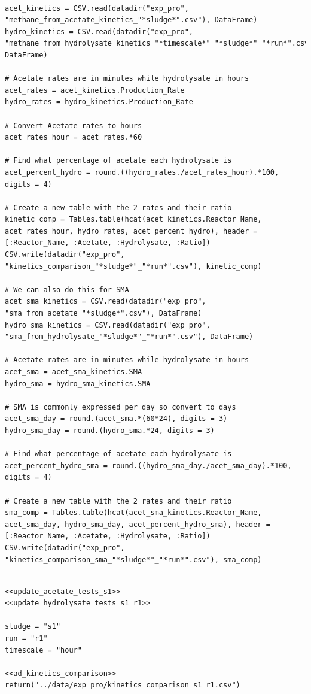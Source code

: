 \documentclass[11pt]{article}
\begin{document}
\begin{verbatim}

acet_kinetics = CSV.read(datadir("exp_pro", "methane_from_acetate_kinetics_"*sludge*".csv"), DataFrame)
hydro_kinetics = CSV.read(datadir("exp_pro", "methane_from_hydrolysate_kinetics_"*timescale*"_"*sludge*"_"*run*".csv"), DataFrame)

# Acetate rates are in minutes while hydrolysate in hours
acet_rates = acet_kinetics.Production_Rate
hydro_rates = hydro_kinetics.Production_Rate

# Convert Acetate rates to hours
acet_rates_hour = acet_rates.*60

# Find what percentage of acetate each hydrolysate is
acet_percent_hydro = round.((hydro_rates./acet_rates_hour).*100, digits = 4)

# Create a new table with the 2 rates and their ratio
kinetic_comp = Tables.table(hcat(acet_kinetics.Reactor_Name, acet_rates_hour, hydro_rates, acet_percent_hydro), header = [:Reactor_Name, :Acetate, :Hydrolysate, :Ratio])
CSV.write(datadir("exp_pro", "kinetics_comparison_"*sludge*"_"*run*".csv"), kinetic_comp)

# We can also do this for SMA
acet_sma_kinetics = CSV.read(datadir("exp_pro", "sma_from_acetate_"*sludge*".csv"), DataFrame)
hydro_sma_kinetics = CSV.read(datadir("exp_pro", "sma_from_hydrolysate_"*sludge*"_"*run*".csv"), DataFrame)

# Acetate rates are in minutes while hydrolysate in hours
acet_sma = acet_sma_kinetics.SMA
hydro_sma = hydro_sma_kinetics.SMA

# SMA is commonly expressed per day so convert to days
acet_sma_day = round.(acet_sma.*(60*24), digits = 3)
hydro_sma_day = round.(hydro_sma.*24, digits = 3)

# Find what percentage of acetate each hydrolysate is
acet_percent_hydro_sma = round.((hydro_sma_day./acet_sma_day).*100, digits = 4)

# Create a new table with the 2 rates and their ratio
sma_comp = Tables.table(hcat(acet_sma_kinetics.Reactor_Name, acet_sma_day, hydro_sma_day, acet_percent_hydro_sma), header = [:Reactor_Name, :Acetate, :Hydrolysate, :Ratio])
CSV.write(datadir("exp_pro", "kinetics_comparison_sma_"*sludge*"_"*run*".csv"), sma_comp)

\end{verbatim}

\begin{verbatim}

<<update_acetate_tests_s1>>
<<update_hydrolysate_tests_s1_r1>>

sludge = "s1"
run = "r1"
timescale = "hour"

<<ad_kinetics_comparison>>
return("../data/exp_pro/kinetics_comparison_s1_r1.csv")
\end{verbatim}
\end{document}
